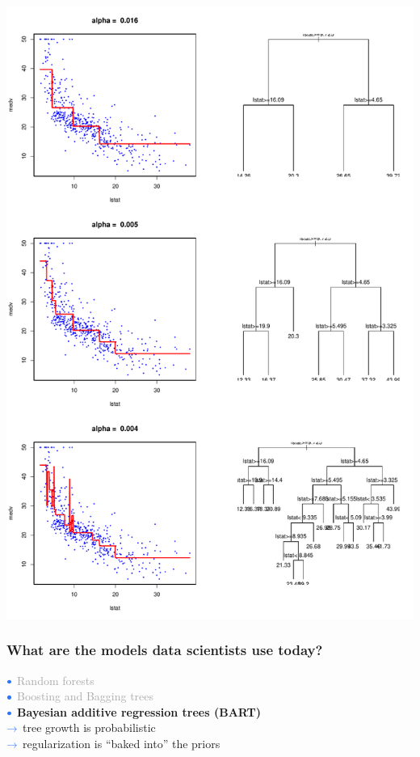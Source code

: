 \documentclass{beamer}
\newcommand{\bo}[1]{\textcolor{burntorange}{#1}}
\newcommand{\lb}[1]{\textcolor{lightblue}{#1}}
\newcommand{\dg}[1]{\textcolor{darkgray}{#1}}
\newcommand{\bb}{$\lb{{\small \bullet } }$ \hspace{0.5mm}}
\newcommand{\ba}{$\lb{{\small \rightarrow } }$ \hspace{0.5mm}}
\newcommand{\sk}{\vspace{.5cm}}
\newcommand{\sko}{\vspace{.1in}}
\begin{document}
\begin{frame}
\begin{minipage}{1.2in}
{}
\end{minipage}
\hspace*{.3in}
\begin{minipage}{2.0in}
\begin{center}
\includegraphics[scale=.32]{boston-lstat-rpart-plotfits.pdf}
\end{center}
\end{minipage}

\end{frame} 


\begin{frame}
	\frametitle{What are the models data scientists use today?}
	
	\bb \dg{Random forests} \\ \sk
	\bb \dg{Boosting and Bagging trees} \\ \sk
	\bb \bo{\bf Bayesian additive regression trees (BART)} \\ \sko
	\hspace*{3mm}\ba tree growth is probabilistic \\ \sko
	\hspace*{3mm}\ba regularization is ``baked into'' the priors
	
\end{frame}
\end{document}
